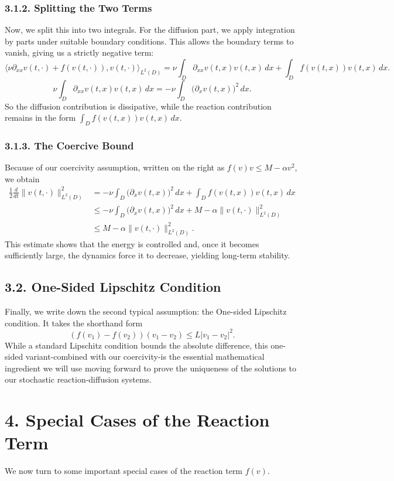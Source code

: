 \documentclass[11pt]{article}
\theoremstyle{definition}
\theoremstyle{remark}
\begin{document}
\subsubsection*{3.1.2. Splitting the Two Terms}
Now, we split this into two integrals. For the diffusion part, we apply integration by parts under suitable boundary conditions. This allows the boundary terms to vanish, giving us a strictly negative term:
\[
\langle\nu\partial_{xx}v(t,\cdot)+f(v(t,\cdot)),v(t,\cdot)\rangle_{L^2(D)}
=
\nu\int_D \partial_{xx}v(t,x)v(t,x)\,dx
+
\int_D f(v(t,x))v(t,x)\,dx.
\]
\[
\nu\int_D \partial_{xx}v(t,x)v(t,x)\,dx
=
-\nu\int_D \bigl(\partial_xv(t,x)\bigr)^2\,dx.
\]
So the diffusion contribution is dissipative, while the reaction contribution remains in the form $\int_D f(v(t,x))v(t,x)\,dx$.

\subsubsection*{3.1.3. The Coercive Bound}
Because of our coercivity assumption, written on the right as $f(v)v\leq M-\alpha v^2$, we obtain
\begin{align*}
\frac12\frac{d}{dt}\|v(t,\cdot)\|_{L^2(D)}^2
&= 
-\nu\int_D \bigl(\partial_xv(t,x)\bigr)^2\,dx + \int_D f(v(t,x))v(t,x)\,dx \\
&\leq
-\nu\int_D \bigl(\partial_xv(t,x)\bigr)^2\,dx + M-\alpha\|v(t,\cdot)\|_{L^2(D)}^2 \\
&\leq
M-\alpha\|v(t,\cdot)\|_{L^2(D)}^2.
\end{align*}
This estimate shows that the energy is controlled and, once it becomes sufficiently large, the dynamics force it to decrease, yielding long-term stability.

\subsection*{3.2. One-Sided Lipschitz Condition}
Finally, we write down the second typical assumption: the One-sided Lipschitz condition. It takes the shorthand form
\[
(f(v_1)-f(v_2))(v_1-v_2)\leq L|v_1-v_2|^2.
\]
While a standard Lipschitz condition bounds the absolute difference, this one-sided variant-combined with our coercivity-is the essential mathematical ingredient we will use moving forward to prove the uniqueness of the solutions to our stochastic reaction-diffusion systems.

\section*{4. Special Cases of the Reaction Term}
We now turn to some important special cases of the reaction term $f(v)$.
\end{document}
